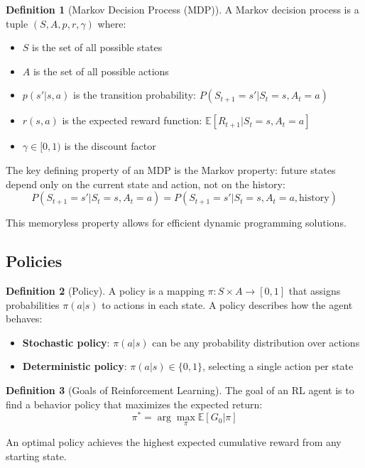\documentclass[12pt,a4paper]{article}
\theoremstyle{definition}
\newtheorem{definition}{Definition}[section]
\begin{document}
\begin{definition}[Markov Decision Process (MDP)]
A Markov decision process is a tuple $(S, A, p, r, \gamma)$ where:
\begin{itemize}
    \item $S$ is the set of all possible states
    \item $A$ is the set of all possible actions
    \item $p(s' | s, a)$ is the transition probability: $P(S_{t+1} = s' | S_t = s, A_t = a)$
    \item $r(s, a)$ is the expected reward function: $\mathbb{E}[R_{t+1} | S_t = s, A_t = a]$
    \item $\gamma \in [0, 1)$ is the discount factor
\end{itemize}

The key defining property of an MDP is the Markov property: future states depend only on the current state and action, not on the history:
\[
P(S_{t+1} = s' | S_t = s, A_t = a) = P(S_{t+1} = s' | S_t = s, A_t = a, \text{history})
\]

This memoryless property allows for efficient dynamic programming solutions.
\end{definition}

\subsection{Policies}

\begin{definition}[Policy]
A policy is a mapping $\pi: S \times A \to [0, 1]$ that assigns probabilities $\pi(a | s)$ to actions in each state. A policy describes how the agent behaves:

\begin{itemize}
    \item \textbf{Stochastic policy}: $\pi(a|s)$ can be any probability distribution over actions
    \item \textbf{Deterministic policy}: $\pi(a|s) \in \{0, 1\}$, selecting a single action per state
\end{itemize}
\end{definition}

\begin{definition}[Goals of Reinforcement Learning]
The goal of an RL agent is to find a behavior policy that maximizes the expected return:
\[
\pi^* = \arg\max_\pi \mathbb{E}[G_0 | \pi]
\]

An optimal policy achieves the highest expected cumulative reward from any starting state.
\end{definition}
\end{document}
